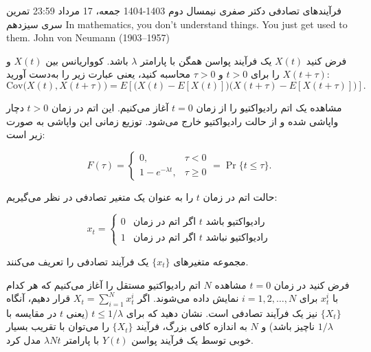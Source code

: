 \documentclass[11pt, a4, twoside]{article}
\begin{document}
	\pagestyle{empty}
	\heading
	{فرآیندهای تصادفی}
	{دکتر صفری}
	{نیمسال دوم 1403-1404}
    {جمعه، 17 مرداد 23:59}
    {تمرین سری سیزدهم}
	\inspiringQuotation
{
    In mathematics, you don't understand things. You just get used to them.
}
{John von Neumann (1903–1957)}
		\begin{problem}
			فرض کنید \( X(t) \) یک فرآیند پواسن همگن با پارامتر \( \lambda \) باشد. کوواریانس بین \( X(t) \) و \( X(t+\tau) \) را برای \( t>0 \) و \( \tau>0 \) محاسبه کنید، یعنی عبارت زیر را به‌دست آورید:
			\[
				\text{Cov}\big(X(t), X(t+\tau)\big) = E\left[\big(X(t) - E[X(t)]\big)\big(X(t+\tau) - E[X(t+\tau)]\big)\right].
			\]
		\end{problem}

		\begin{problem}
						
			مشاهده یک اتم رادیواکتیو را از زمان $t=0$ آغاز می‌کنیم. این اتم در زمان $t>0$ دچار واپاشی شده و از حالت رادیواکتیو خارج می‌شود. توزیع زمانی این واپاشی به صورت زیر است:

			\[
			F(\tau) = 
			\begin{cases} 
			0, & \tau < 0 \\
			1 - e^{-\lambda t}, & \tau \geq 0 
			\end{cases}
			= \Pr\{t \leq \tau\}.
			\]

			حالت اتم در زمان $t$ را به عنوان یک متغیر تصادفی در نظر می‌گیریم:

			\[
			x_t = 
			\begin{cases} 
			0 & \text{اگر اتم در زمان $t$ رادیواکتیو باشد} \\
			1 & \text{اگر اتم در زمان $t$ رادیواکتیو نباشد}
			\end{cases}
			\]

			مجموعه متغیرهای $\{x_t\}$ یک فرآیند تصادفی را تعریف می‌کنند.

			فرض کنید در زمان $t=0$ مشاهده $N$ اتم رادیواکتیو مستقل را آغاز می‌کنیم که هر کدام با $x^i_t$ برای $i = 1, 2, \ldots, N$ نمایش داده می‌شوند. اگر $X_t = \sum_{i=1}^N x^i_t$ قرار دهیم، آنگاه $\{X_t\}$ نیز یک فرآیند تصادفی است. نشان دهید که برای $t \leq 1/\lambda$ (یعنی $t$ در مقایسه با $1/\lambda$ ناچیز باشد) و $N$ به اندازه کافی بزرگ، فرآیند $\{X_t\}$ را می‌توان با تقریب بسیار خوبی توسط یک فرآیند پواسن $Y(t)$ با پارامتر $\lambda N t$ مدل کرد.

		\end{problem}
\end{document}
